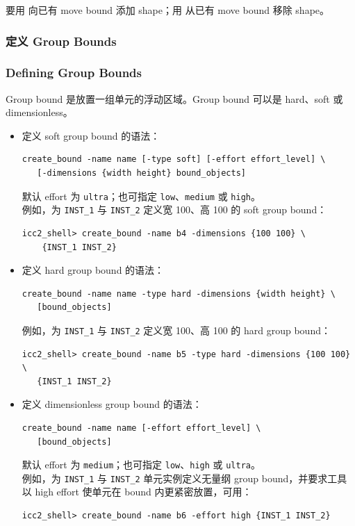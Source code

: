 要用  向已有 move bound 添加 shape；用  从已有 move bound 移除 shape。

\subsubsection{定义 Group Bounds}
\subsubsection*{Defining Group Bounds}

Group bound 是放置一组单元的浮动区域。Group bound 可以是 hard、soft 或 dimensionless。
\begin{itemize}
  \item 定义 soft group bound 的语法：
\begin{lstlisting}
create_bound -name name [-type soft] [-effort effort_level] \
   [-dimensions {width height} bound_objects]
\end{lstlisting}
    默认 effort 为 \texttt{ultra}；也可指定 \texttt{low}、\texttt{medium} 或 \texttt{high}。\\
    例如，为 \texttt{INST\_1} 与 \texttt{INST\_2} 定义宽 100、高 100 的 soft group bound：
\begin{lstlisting}
icc2_shell> create_bound -name b4 -dimensions {100 100} \
    {INST_1 INST_2}
\end{lstlisting}

  \item 定义 hard group bound 的语法：
\begin{lstlisting}
create_bound -name name -type hard -dimensions {width height} \
   [bound_objects]
\end{lstlisting}
    例如，为 \texttt{INST\_1} 与 \texttt{INST\_2} 定义宽 100、高 100 的 hard group bound：
\begin{lstlisting}
icc2_shell> create_bound -name b5 -type hard -dimensions {100 100} \
   {INST_1 INST_2}
\end{lstlisting}

  \item 定义 dimensionless group bound 的语法：
\begin{lstlisting}
create_bound -name name [-effort effort_level] \
   [bound_objects]
\end{lstlisting}
    默认 effort 为 \texttt{medium}；也可指定 \texttt{low}、\texttt{high} 或 \texttt{ultra}。\\
    例如，为 \texttt{INST\_1} 与 \texttt{INST\_2} 单元实例定义无量纲 group bound，并要求工具以 high effort 使单元在 bound 内更紧密放置，可用：
\begin{lstlisting}
icc2_shell> create_bound -name b6 -effort high {INST_1 INST_2}
\end{lstlisting}
\end{itemize}

